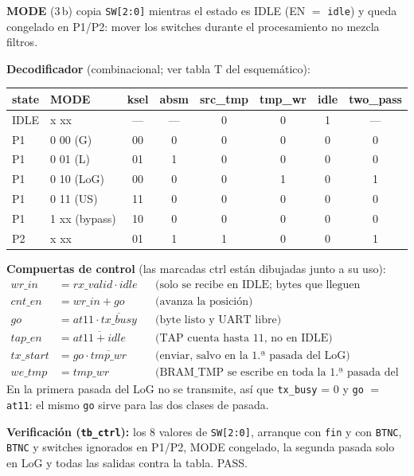 \documentclass[11pt,a4paper]{article}
\newcommand{\sig}[1]{\texttt{\color{azul}#1}}
\newcommand{\bus}[1]{\texttt{#1}}
\begin{document}
\textbf{MODE} (3\,b) copia \bus{SW[2:0]} mientras el estado es IDLE (EN $=$ \sig{idle}) y queda congelado en P1/P2: mover los switches durante el procesamiento no mezcla filtros.

\textbf{Decodificador} (combinacional; ver tabla T del esquemático):

\begin{center}
\small
\begin{tabular}{llcccccc}
\toprule
\textbf{state} & \textbf{MODE} & \textbf{ksel} & \textbf{absm} & \textbf{src\_tmp} & \textbf{tmp\_wr} & \textbf{idle} & \textbf{two\_pass} \\
\midrule
IDLE & x xx & — & — & 0 & 0 & 1 & — \\
P1 & 0 00 (G) & 00 & 0 & 0 & 0 & 0 & 0 \\
P1 & 0 01 (L) & 01 & 1 & 0 & 0 & 0 & 0 \\
P1 & 0 10 (LoG) & 00 & 0 & 0 & 1 & 0 & 1 \\
P1 & 0 11 (US) & 11 & 0 & 0 & 0 & 0 & 0 \\
P1 & 1 xx (bypass) & 10 & 0 & 0 & 0 & 0 & 0 \\
P2 & x xx & 01 & 1 & 1 & 0 & 0 & 1 \\
\bottomrule
\end{tabular}
\end{center}

\textbf{Compuertas de control} (las marcadas ctrl están dibujadas junto a su uso):
\[
\begin{aligned}
wr\_in &= rx\_valid \cdot idle && \text{(solo se recibe en IDLE; bytes que lleguen procesando se ignoran)}\\
cnt\_en &= wr\_in + go && \text{(avanza la posición)}\\
go &= at11 \cdot \overline{tx\_busy} && \text{(byte listo y UART libre)}\\
tap\_en &= \overline{at11 + idle} && \text{(TAP cuenta hasta 11, no en IDLE)}\\
tx\_start &= go \cdot \overline{tmp\_wr} && \text{(enviar, salvo en la 1.ª pasada del LoG)}\\
we\_tmp &= tmp\_wr && \text{(BRAM\_TMP se escribe en toda la 1.ª pasada del LoG)}
\end{aligned}
\]
En la primera pasada del LoG no se transmite, así que \sig{tx\_busy} = 0 y \sig{go} $=$ \sig{at11}: el mismo \sig{go} sirve para las dos clases de pasada.

\textbf{Verificación (\texttt{tb\_ctrl}):} los 8 valores de \bus{SW[2:0]}, arranque con \sig{fin} y con \bus{BTNC}, \bus{BTNC} y switches ignorados en P1/P2, MODE congelado, la segunda pasada solo en LoG y todas las salidas contra la tabla. PASS.
\end{document}
